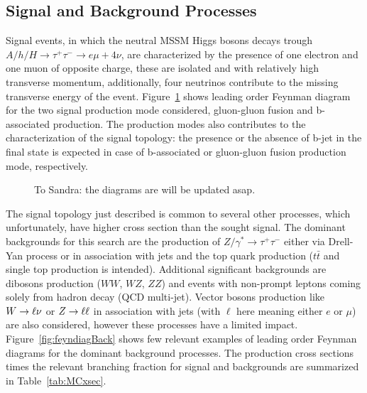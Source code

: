 \subsection{Signal and Background Processes}
Signal events, in which the neutral MSSM Higgs bosons decays trough 
$A/h/H \rightarrow \tau^+ \tau^- \rightarrow e \mu +4\nu$, are characterized 
by the presence of one electron and one muon of opposite charge, these are isolated and with 
relatively high transverse momentum, additionally, four neutrinos contribute to the missing transverse energy of the event. 
Figure~\ref{fig:feyndiagSignal} shows leading order Feynman diagram for the two signal production mode considered,
gluon-gluon fusion and b-associated production.
The production modes also contributes to the characterization of the signal topology: the presence or the absence 
of b-jet in the final state is expected in case of  b-associated or gluon-gluon fusion production mode, respectively.

\begin{figure}[tp]
     \begin{center}


    \end{center}
    \caption{To Sandra: the diagrams are will be updated asap.}    
	
   \label{fig:feyndiagSignal}
\end{figure}


The signal topology  just described is common to several other processes, which unfortunately, 
have higher cross section than the sought signal.
The dominant backgrounds for this search are the production of  $Z/\gamma^* \rightarrow \tau^+ \tau^- $
either via Drell-Yan process or in association with jets and the top quark production ($t\bar{t}$ and single top production is intended). 
Additional significant backgrounds are  dibosons production 
($WW$, $WZ$, $ZZ$) and  events with non-prompt leptons coming solely from hadron decay (QCD multi-jet).
Vector bosons production like  $W\rightarrow \ell \nu$ or $Z\rightarrow \ell \ell$ in association with jets (with $\ell$ here meaning either $e$ or $\mu$) 
are also considered, however these processes have a limited impact. Figure~\ref{fig:feyndiagBack} shows few relevant examples of 
leading order Feynman diagrams for the dominant background processes.
The production cross sections times the relevant branching fraction for signal and backgrounds are summarized in
Table~\ref{tab:MCxsec}. 
%

